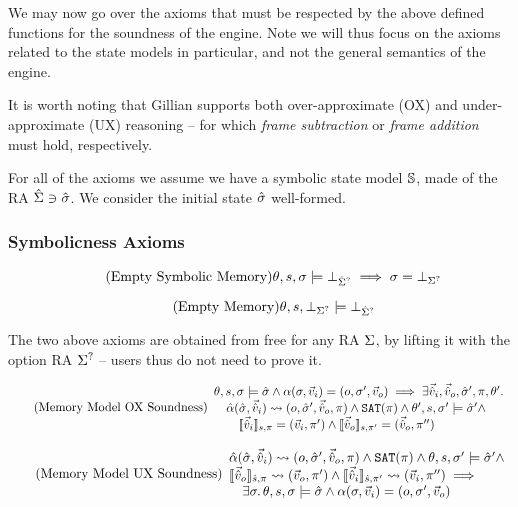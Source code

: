 We may now go over the axioms that must be respected by the above defined functions for the soundness of the engine. Note we will thus focus on the axioms related to the state models in particular, and not the general semantics of the engine.

It is worth noting that Gillian supports both over-approximate (OX) and under-approximate (UX) reasoning -- for which \emph{frame subtraction} or \emph{frame addition} must hold, respectively.

For all of the axioms we assume we have a symbolic state model $\mmdl$, made of the RA $\Sst \ni \sst$. We consider the initial state $\sst$ well-formed.

\subsubsection{Symbolicness Axioms }

\begin{equation}
\tag{Empty Symbolic Memory}\label{eq:empty-sym-mem}
\theta,s,\st\models \bot_{\Sst^?} \implies \st = \bot_{\St^?}
\end{equation}

\begin{equation}
\tag{Empty Memory}\label{eq:empty-mem}
\theta,s,\bot_{\St^?}\models \bot_{\Sst^?}
\end{equation}

The two above axioms are obtained from free for any RA $\St$, by lifting it with the option RA $\St^?$ -- users thus do not need to prove it.

\begin{equation}
\tag{Memory Model OX Soundness}\label{eq:mem-ox-soundness}
\begin{array}{l}
\theta,s,\st\models\sst \land \ppexecc{\alpha}{\st,\ins}{o,\st',\outs} \implies \exists \sins,\souts,\sst',\pc,\theta'\ldotp\\
\quad \ppexec{\sym\alpha}{\sst,\sins}{o,\sst',\souts,\pc} \land \SAT(\pc) \land \theta',s,\st'\models \sst' \land\\
\qquad \expeval[s,\pc]{\sins}=(\ins,\pc')\land\expeval[s,\pc']{\souts}=(\souts,\pc'')
\end{array}
\end{equation}

\begin{equation}
\tag{Memory Model UX Soundness}\label{eq:mem-ux-soundness}
\begin{array}{l}
\ppexec{\sym\alpha}{\sst,\sins}{o,\sst',\souts,\pc} \land \SAT(\pc) \land \theta,s,\st'\models\sst' \land \\
\expeval[\sym s,\pc]{\souts}\rightsquigarrow(\outs,\pc')\land \expeval[\sym s,\pc']{\sins}\rightsquigarrow(\ins,\pc'')\implies\\
\quad \exists \st\ldotp \theta,s,\st\models\sst \land \ppexecc{\alpha}{\st,\ins}{o,\st',\outs}
\end{array}
\end{equation}

